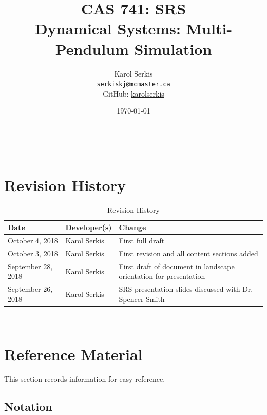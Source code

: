 \documentclass[12pt]{article}
\newcommand{\progname}{Multi-Pendulum Simulation }
\begin{document}

\title{CAS 741: SRS\\[10pt]\Large Dynamical Systems: \progname}
\author{Karol Serkis\\\texttt{serkiskj@mcmaster.ca}\\GitHub:
\href{https://www.github.com/karolserkis}{karolserkis}}
\date{\today}
	
\maketitle

~\newpage

\tableofcontents

\clearpage

\setcounter{secnumdepth}{0}

\section{Revision History}

\begin{table}[hp]
\caption{Revision History}
\begin{tabularx}{\textwidth}{llX}
\toprule
\textbf{Date} & \textbf{Developer(s)} & \textbf{Change}\\
\midrule
October 4, 2018 & Karol Serkis &  First full draft\\
October 3, 2018 & Karol Serkis & First revision and all content sections added\\September 28, 2018 & 
Karol Serkis & First draft of document in landscape
orientation for presentation\\
September 26, 2018 & Karol Serkis & SRS presentation slides discussed with Dr.
Spencer Smith \\
\bottomrule
\end{tabularx}
\end{table}

~\newpage

\section{Reference Material}

This section records information for easy reference.

\subsection{Notation}
\end{document}
